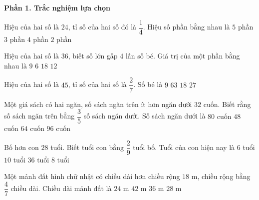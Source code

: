 \textbf{Phần 1. Trắc nghiệm lựa chọn}

\begin{ex} %
Hiệu của hai số là $24$, tỉ số của hai số đó là $\dfrac{1}{4}$. Hiệu số phần bằng nhau là
\choice
{$5$ phần}
{\True $3$ phần}
{$4$ phần}
{$2$ phần}
\end{ex}

\begin{ex} %
Hiệu của hai số là $36$, biết số lớn gấp $4$ lần số bé. Giá trị của một phần bằng nhau là
\choice
{$9$}
{$6$}
{$18$}
{\True $12$}
\end{ex}

\begin{ex} %
Hiệu của hai số là $45$, tỉ số của hai số là $\dfrac{2}{7}$. Số bé là
\choice
{$9$}
{$63$}
{\True $18$}
{$27$}
\end{ex}

\begin{ex} %
Một giá sách có hai ngăn, số sách ngăn trên ít hơn ngăn dưới $32$ cuốn. Biết rằng số sách ngăn trên bằng $\dfrac{3}{5}$ số sách ngăn dưới. Số sách ngăn dưới là
\choice
{\True $80$ cuốn}
{$48$ cuốn}
{$64$ cuốn}
{$96$ cuốn}
\end{ex}

\begin{ex} %
Bố hơn con $28$ tuổi. Biết tuổi con bằng $\dfrac{2}{9}$ tuổi bố. Tuổi của con hiện nay là
\choice
{$6$ tuổi}
{$10$ tuổi}
{$36$ tuổi}
{\True $8$ tuổi}
\end{ex}

\begin{ex} %
Một mảnh đất hình chữ nhật có chiều dài hơn chiều rộng $18\text{ m}$, chiều rộng bằng $\dfrac{4}{7}$ chiều dài. Chiều dài mảnh đất là
\choice
{$24\text{ m}$}
{\True $42\text{ m}$}
{$36\text{ m}$}
{$28\text{ m}$}
\end{ex}

